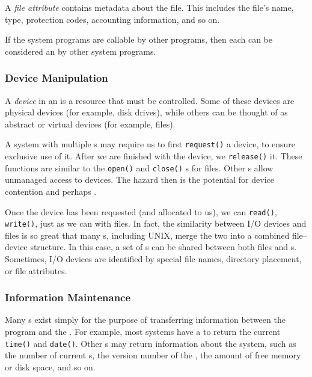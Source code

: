 \begin{definition}\label{def:File_Attribute}
  A \emph{file attribute} contains metadata about the file.
  This includes the file's name, type, protection codes, accounting information, and so on.
\end{definition}

\begin{remark*}
  If the system programs are callable by other programs, then each can be considered an  by other system programs.
\end{remark*}

\subsubsection{Device Manipulation}\label{subsubsec:Device_Manipulation}
\begin{definition}[Device]\label{def:Device}
  A \emph{device} in an  is a resource that must be controlled.
  Some of these devices are physical devices (for example, disk drives), while others can be thought of as abstract or virtual devices (for example, files).
\end{definition}

A system with multiple s may require us to first \texttt{request()} a device, to ensure exclusive use of it.
After we are finished with the device, we \texttt{release()} it.
These functions are similar to the \texttt{open()} and \texttt{close()} s for files.
Other s allow unmanaged access to devices.
The hazard then is the potential for device contention and perhaps .

Once the device has been requested (and allocated to us), we can \texttt{read()}, \texttt{write()}, just as we can with files.
In fact, the similarity between I/O devices and files is so great that many s, including UNIX, merge the two into a combined file–device structure.
In this case, a set of s can be shared between both files and s.
Sometimes, I/O devices are identified by special file names, directory placement, or file attributes.

\subsubsection{Information Maintenance}\label{subsubsec:Information_Maintenance}
Many s exist simply for the purpose of transferring information between the  program and the .
For example, most systems have a  to return the current \texttt{time()} and \texttt{date()}.
Other s may return information about the system, such as the number of current s, the version number of the , the amount of free memory or disk space, and so on.

